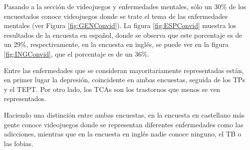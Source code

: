 \documentclass[12pt, a4paper,twoside,titlepage]{book}
\newcommand{\comm}[1]{\todo[linecolor=yellow]{\textsf{#1}}}
\newcommand{\commin}[1]{\todo[inline,linecolor=yellow]{\textsf{#1}}}
\begin{document}

 Pasando a la sección de videojuegos y enfermedades mentales, sólo un 30\% de los encuestados conoce videojuegos donde se trate el tema de las enfermedades mentales (ver Figura \ref{fig:GENConvid}). La figura  \ref{fig:ESPConvid} muestra los resultados de la encuesta en español, donde se observa que este porcentaje es de un 29\%, respectivamente, en la encuesta en inglés, se puede ver en la figura \ref{fig:INGConvid}, que el porcentaje es de un 36\%. 



Entre las enfermedades que se consideran mayoritariamente representadas están, en primer lugar la depresión, coincidente en ambas encuestas, seguida de los TPs y el TEPT. Por otro lado, los TCAs son los trastornos que menos se ven representados.  

Haciendo una distinción entre ambas encuestas, en la encuesta en castellano más gente conoce videojuegos donde se representan diferentes enfermedades como las adicciones, mientras que en la encuesta en inglés nadie conoce ninguno, el TB o las fobias. 
\end{document}
